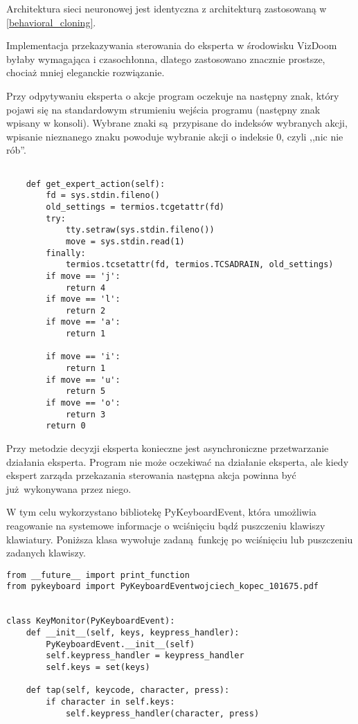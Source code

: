 Architektura sieci neuronowej jest identyczna z architekturą zastosowaną w \ref{behavioral_cloning}.

Implementacja przekazywania sterowania do eksperta w środowisku VizDoom byłaby wymagająca i czasochłonna, dlatego zastosowano znacznie prostsze, chociaż mniej eleganckie rozwiązanie.

Przy odpytywaniu eksperta o akcje program oczekuje na następny znak, który pojawi się na standardowym strumieniu wejścia programu (następny znak wpisany w konsoli). Wybrane znaki są przypisane do indeksów wybranych akcji, wpisanie nieznanego znaku powoduje wybranie akcji o indeksie 0, czyli ,,nic nie rób''.

\begin{lstlisting}[language=iPython]

    def get_expert_action(self):
        fd = sys.stdin.fileno()
        old_settings = termios.tcgetattr(fd)
        try:
            tty.setraw(sys.stdin.fileno())
            move = sys.stdin.read(1)
        finally:
            termios.tcsetattr(fd, termios.TCSADRAIN, old_settings)
        if move == 'j':
            return 4
        if move == 'l':
            return 2
        if move == 'a':
            return 1

        if move == 'i':
            return 1
        if move == 'u':
            return 5
        if move == 'o':
            return 3
        return 0
\end{lstlisting}

Przy metodzie decyzji eksperta konieczne jest asynchroniczne przetwarzanie działania eksperta. Program nie może oczekiwać na działanie eksperta, ale kiedy ekspert zarząda przekazania sterowania następna akcja powinna być już wykonywana przez niego.

W tym celu wykorzystano bibliotekę PyKeyboardEvent, która umożliwia reagowanie na systemowe informacje o wciśnięciu bądź puszczeniu klawiszy klawiatury. Poniższa klasa wywołuje zadaną funkcję po wciśnięciu lub puszczeniu zadanych klawiszy.


\begin{lstlisting}[language=iPython]
from __future__ import print_function
from pykeyboard import PyKeyboardEventwojciech_kopec_101675.pdf


class KeyMonitor(PyKeyboardEvent):
    def __init__(self, keys, keypress_handler):
        PyKeyboardEvent.__init__(self)
        self.keypress_handler = keypress_handler
        self.keys = set(keys)

    def tap(self, keycode, character, press):
        if character in self.keys:
            self.keypress_handler(character, press)
\end{lstlisting}

